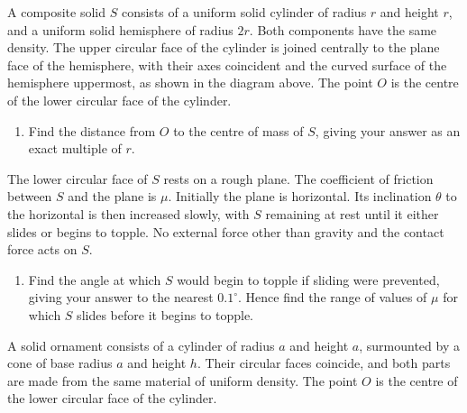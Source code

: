 \documentclass[leqno]{article}
\begin{document}
\begin{enumerate}[
  label=\textbf{\arabic*.},
  leftmargin=*,
  topsep=0pt,
  partopsep=0pt,
  parsep=0pt
]
A composite solid $S$ consists of a uniform solid cylinder of radius $r$ and height $r$, and a uniform solid hemisphere of radius $2r$. Both components have the same density. The upper circular face of the cylinder is joined centrally to the plane face of the hemisphere, with their axes coincident and the curved surface of the hemisphere uppermost, as shown in the diagram above. The point $O$ is the centre of the lower circular face of the cylinder. \\
\begin{enumerate}[label=\textbf{(\alph*)}]
\item Find the distance from $O$ to the centre of mass of $S$, giving your answer as an exact multiple of $r$.  \\
\end{enumerate}
The lower circular face of $S$ rests on a rough plane. The coefficient of friction between $S$ and the plane is $\mu$. Initially the plane is horizontal. Its inclination $\theta$ to the horizontal is then increased slowly, with $S$ remaining at rest until it either slides or begins to topple. No external force other than gravity and the contact force acts on $S$. \\
\begin{enumerate}[label=\textbf{(\alph*)}, resume]
\item Find the angle at which $S$ would begin to topple if sliding were prevented, giving your answer to the nearest $0.1^\circ$. Hence find the range of values of $\mu$ for which $S$ slides before it begins to topple.  \\
\end{enumerate}

\newpage

\questionitem

A solid ornament consists of a cylinder of radius $a$ and height $a$, surmounted by a cone of base radius $a$ and height $h$. Their circular faces coincide, and both parts are made from the same material of uniform density. The point $O$ is the centre of the lower circular face of the cylinder. \\


\end{enumerate}
\end{document}
